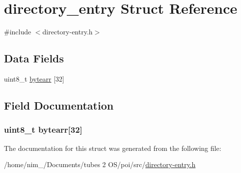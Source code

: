\hypertarget{structdirectory__entry}{\section{directory\-\_\-entry Struct Reference}
\label{structdirectory__entry}
}


{\ttfamily \#include $<$directory-\/entry.\-h$>$}

\subsection*{Data Fields}
\begin{DoxyCompactItemize}
\item 
uint8\-\_\-t \hyperlink{structdirectory__entry_a380aef5511e7e06c9677a3ef970b32bc}{bytearr} \mbox{[}32\mbox{]}
\end{DoxyCompactItemize}


\subsection{Field Documentation}
\hypertarget{structdirectory__entry_a380aef5511e7e06c9677a3ef970b32bc}{
\subsubsection[{bytearr}]{\setlength{\rightskip}{0pt plus 5cm}uint8\-\_\-t bytearr\mbox{[}32\mbox{]}}}\label{structdirectory__entry_a380aef5511e7e06c9677a3ef970b32bc}


The documentation for this struct was generated from the following file\-:\begin{DoxyCompactItemize}
\item 
/home/nim\-\_/\-Documents/tubes 2 O\-S/poi/src/\hyperlink{directory-entry_8h}{directory-\/entry.\-h}\end{DoxyCompactItemize}
